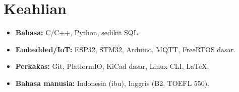 \section{Keahlian}
\begin{itemize}
  \item \textbf{Bahasa:} C/C++, Python, sedikit SQL.
  \item \textbf{Embedded/IoT:} ESP32, STM32, Arduino, MQTT, FreeRTOS dasar.
  \item \textbf{Perkakas:} Git, PlatformIO, KiCad dasar, Linux CLI, LaTeX.
  \item \textbf{Bahasa manusia:} Indonesia (ibu), Inggris (B2, TOEFL 550).
\end{itemize}
